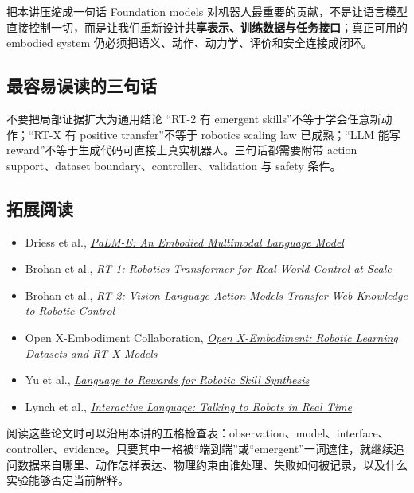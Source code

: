 \documentclass[a4paper]{article}
\begin{document}
\begin{importantbox}{把本讲压缩成一句话}
Foundation models 对机器人最重要的贡献，不是让语言模型直接控制一切，而是让我们重新设计\textbf{共享表示、训练数据与任务接口}；真正可用的 embodied system 仍必须把语义、动作、动力学、评价和安全连接成闭环。
\end{importantbox}

\subsection{最容易误读的三句话}

\begin{warningbox}{不要把局部证据扩大为通用结论}
“RT-2 有 emergent skills”不等于学会任意新动作；“RT-X 有 positive transfer”不等于 robotics scaling law 已成熟；“LLM 能写 reward”不等于生成代码可直接上真实机器人。三句话都需要附带 action support、dataset boundary、controller、validation 与 safety 条件。
\end{warningbox}

\subsection{拓展阅读}

\begin{itemize}
  \item Driess et al., \href{https://arxiv.org/abs/2303.03378}{\emph{PaLM-E: An Embodied Multimodal Language Model}}
  \item Brohan et al., \href{https://arxiv.org/abs/2212.06817}{\emph{RT-1: Robotics Transformer for Real-World Control at Scale}}
  \item Brohan et al., \href{https://arxiv.org/abs/2307.15818}{\emph{RT-2: Vision-Language-Action Models Transfer Web Knowledge to Robotic Control}}
  \item Open X-Embodiment Collaboration, \href{https://arxiv.org/abs/2310.08864}{\emph{Open X-Embodiment: Robotic Learning Datasets and RT-X Models}}
  \item Yu et al., \href{https://arxiv.org/abs/2306.08647}{\emph{Language to Rewards for Robotic Skill Synthesis}}
  \item Lynch et al., \href{https://arxiv.org/abs/2206.04717}{\emph{Interactive Language: Talking to Robots in Real Time}}
\end{itemize}

阅读这些论文时可以沿用本讲的五格检查表：observation、model、interface、controller、evidence。只要其中一格被“端到端”或“emergent”一词遮住，就继续追问数据来自哪里、动作怎样表达、物理约束由谁处理、失败如何被记录，以及什么实验能够否定当前解释。
\end{document}
